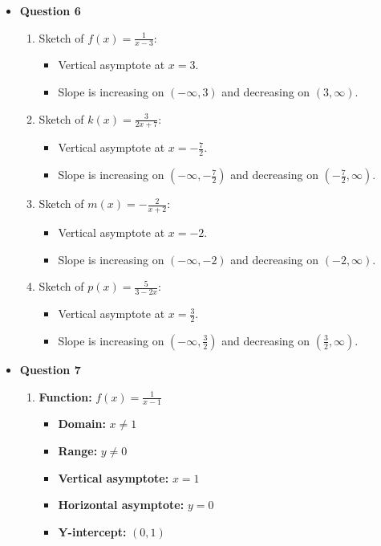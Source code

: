 \documentclass{article}
\begin{document}
\begin{itemize}
    \item \textbf{Question 6}
    \begin{enumerate}[label=\alph*)]
        \item Sketch of $f(x) = \frac{1}{x-3}$:
            \begin{itemize}
                \item Vertical asymptote at $x = 3$.
                \item Slope is increasing on $(-\infty, 3)$ and decreasing on $(3, \infty)$.
            \end{itemize}
        
        \item Sketch of $k(x) = \frac{3}{2x+7}$:
            \begin{itemize}
                \item Vertical asymptote at $x = -\frac{7}{2}$.
                \item Slope is increasing on $(-\infty, -\frac{7}{2})$ and decreasing on $(-\frac{7}{2}, \infty)$.
            \end{itemize}
        
        \item Sketch of $m(x) = -\frac{2}{x+2}$:
            \begin{itemize}
                \item Vertical asymptote at $x = -2$.
                \item Slope is increasing on $(-\infty, -2)$ and decreasing on $(-2, \infty)$.
            \end{itemize}
        
        \item Sketch of $p(x) = \frac{5}{3-2x}$:
            \begin{itemize}
                \item Vertical asymptote at $x = \frac{3}{2}$.
                \item Slope is increasing on $(-\infty, \frac{3}{2})$ and decreasing on $(\frac{3}{2}, \infty)$.
            \end{itemize}
    \end{enumerate}
    
    \item \textbf{Question 7}
    \begin{enumerate}[label=\alph*)]
        \item \textbf{Function:} $f(x) = \frac{1}{x-1}$
            \begin{itemize}
                \item \textbf{Domain:} $x \neq 1$
                \item \textbf{Range:} $y \neq 0$
                \item \textbf{Vertical asymptote:} $x = 1$
                \item \textbf{Horizontal asymptote:} $y = 0$
                \item \textbf{Y-intercept:} $(0, 1)$
            \end{itemize}
        

\end{enumerate}
\end{itemize}
\end{document}
